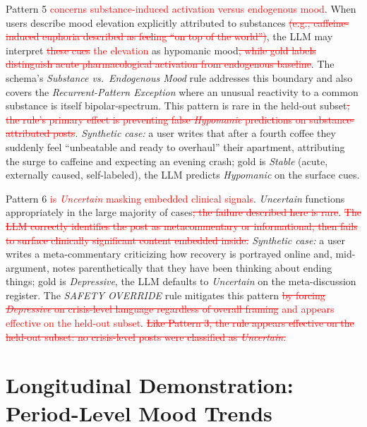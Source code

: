 \documentclass[runningheads]{llncs}
\newcommand{\rev}[1]{\textcolor{red}{#1}}
\newcommand{\del}[1]{\textcolor{red}{\sout{#1}}}
\newcommand{\rev}[1]{#1}
\newcommand{\del}[1]{}
\begin{document}
Pattern 5 \rev{concerns substance-induced activation versus endogenous mood}. When users describe mood elevation explicitly attributed to substances\del{ (e.g., caffeine-induced euphoria described as feeling ``on top of the world'')}, the LLM may interpret \del{these cues} \rev{the elevation} as hypomanic mood\del{, while gold labels distinguish acute pharmacological activation from endogenous baseline}. The schema's \emph{Substance vs.~Endogenous Mood} rule addresses this boundary and also covers the \emph{Recurrent-Pattern Exception} where an unusual reactivity to a common substance is itself bipolar-spectrum. This pattern is rare in the held-out subset\del{; the rule's primary effect is preventing false \emph{Hypomanic} predictions on substance-attributed posts}. \emph{Synthetic case:} a user writes that after a fourth coffee they suddenly feel ``unbeatable and ready to overhaul'' their apartment, attributing the surge to caffeine and expecting an evening crash; gold is \emph{Stable} (acute, externally caused, self-labeled), the LLM predicts \emph{Hypomanic} on the surface cues.

Pattern 6 \rev{is \emph{Uncertain} masking embedded clinical signals}. \emph{Uncertain} functions appropriately in the large majority of cases\del{; the failure described here is rare}. \del{The LLM correctly identifies the post as metacommentary or informational, then fails to surface clinically significant content embedded inside.} \emph{Synthetic case:} a user writes a meta-commentary criticizing how recovery is portrayed online and, mid-argument, notes parenthetically that they have been thinking about ending things; gold is \emph{Depressive}, the LLM defaults to \emph{Uncertain} on the meta-discussion register. The \emph{SAFETY OVERRIDE} rule mitigates this pattern\del{ by forcing \emph{Depressive} on crisis-level language regardless of overall framing} \rev{and appears effective on the held-out subset}. \del{Like Pattern 3, the rule appears effective on the held-out subset: no crisis-level posts were classified as \emph{Uncertain}.}

\section{Longitudinal Demonstration: Period-Level Mood Trends}
\label{sec:pilot}
\end{document}
